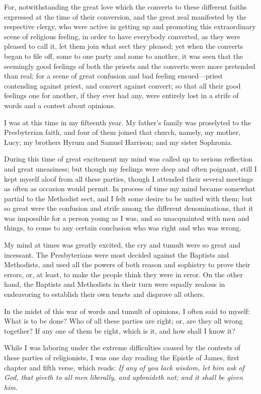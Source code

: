 For, notwithstanding the great love which the converts to these different faiths expressed at
the time of their conversion, and the great zeal manifested by the respective clergy, who were
active in getting up and promoting this extraordinary scene of religious feeling, in order to
have everybody converted, as they were pleased to call it, let them join what sect they
pleased; yet when the converts began to file off, some to one party and some to another, it
was seen that the seemingly good feelings of both the priests and the converts were more
pretended than real; for a scene of great confusion and bad feeling ensued—priest contending
against priest, and convert against convert; so that all their good feelings one for another, if
they ever had any, were entirely lost in a strife of words and a contest about opinions.

I was at this time in my fifteenth year. My father's family was proselyted to the Presbyterian
faith, and four of them joined that church, namely, my mother, Lucy; my brothers Hyrum and
Samuel Harrison; and my sister Sophronia.

During this time of great excitement my mind was called up to serious reflection and great
uneasiness; but though my feelings were deep and often poignant, still I kept myself aloof
from all these parties, though I attended their several meetings as often as occasion would
permit. In process of time my mind became somewhat partial to the Methodist sect, and I felt
some desire to be united with them; but so great were the confusion and strife among the
different denominations, that it was impossible for a person young as I was, and so
unacquainted with men and things, to come to any certain conclusion who was right and who
was wrong.

My mind at times was greatly excited, the cry and tumult were so great and incessant. The
Presbyterians were most decided against the Baptists and Methodists, and used all the powers
of both reason and sophistry to prove their errors, or, at least, to make the people think they
were in error. On the other hand, the Baptists and Methodists in their turn were equally
zealous in endeavoring to establish their own tenets and disprove all others.

In the midst of this war of words and tumult of opinions, I often said to myself: What is to be
done? Who of all these parties are right; or, are they all wrong together? If any one of them
be right, which is it, and how shall I know it?

While I was laboring under the extreme difficulties caused by the contests of these parties of
religionists, I was one day reading the Epistle of James, first chapter and fifth verse, which
reads: \textit{If any of you lack wisdom, let him ask of God, that giveth to all men liberally, and
upbraideth not; and it shall be given him.}

